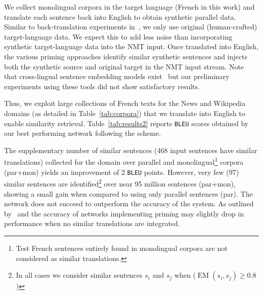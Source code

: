 We collect monolingual corpora in the target language (French in this work) and translate each sentence back into English to obtain synthetic parallel data. Similar to back-translation experiments in~\citet{Sennrich16improving}, we only use original (human-crafted) target-language data. We expect this to add less noise than incorporating synthetic target-language data into the NMT input.
Once translated into English, the various priming approaches identify similar synthetic sentences and injects both the synthetic source and original target in the NMT input stream.
%
Note that cross-lingual sentence embedding models exist~\cite{sabet2019robust,schwenk17learning,Conneau19crosslingual} but our preliminary experiments using these tools did not show satisfactory results.

Thus, we exploit large collections of French texts for the News and Wikipedia domains (as detailed in Table~\ref{tab:corpora}) that we translate into English to enable similarity retrieval. 
%
Table~\ref{tab:results2} reports \texttt{BLEU} scores obtained by our best performing network  following the  scheme.


The supplementary number of similar sentences (468 input sentences have similar translations) collected for the  domain over parallel and monolingual\footnote{Test French sentences entirely found in monolingual  corpora are not considered as similar translations.} corpora (par+mon) yields an improvement of 2 \texttt{BLEU} points.
However, very few (97) similar sentences are identified\footnote{In all cases we consider similar sentences $s_i$ and $s_j$ when ($\operatorname{EM}(s_i,s_j) \ge 0.8$)} over near 95 million sentences (par+mon), showing a small gain when compared to using only parallel sentences (par). The network does not succeed to outperform the accuracy of the  system. 
As outlined by~\citet{bulte19neural} and \citet{xu20boosting} the accuracy of networks implementing priming may slightly drop in performance when no similar translations are integrated. 

